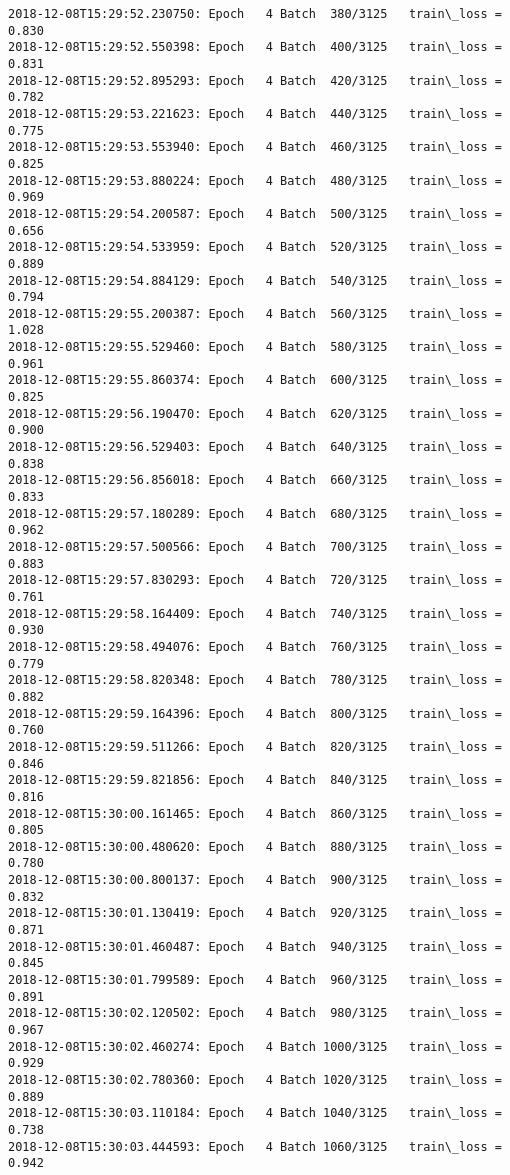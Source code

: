 \documentclass[11pt]{article}
\begin{document}
\begin{Verbatim}[commandchars=\\\{\}]
2018-12-08T15:29:52.230750: Epoch   4 Batch  380/3125   train\_loss = 0.830
2018-12-08T15:29:52.550398: Epoch   4 Batch  400/3125   train\_loss = 0.831
2018-12-08T15:29:52.895293: Epoch   4 Batch  420/3125   train\_loss = 0.782
2018-12-08T15:29:53.221623: Epoch   4 Batch  440/3125   train\_loss = 0.775
2018-12-08T15:29:53.553940: Epoch   4 Batch  460/3125   train\_loss = 0.825
2018-12-08T15:29:53.880224: Epoch   4 Batch  480/3125   train\_loss = 0.969
2018-12-08T15:29:54.200587: Epoch   4 Batch  500/3125   train\_loss = 0.656
2018-12-08T15:29:54.533959: Epoch   4 Batch  520/3125   train\_loss = 0.889
2018-12-08T15:29:54.884129: Epoch   4 Batch  540/3125   train\_loss = 0.794
2018-12-08T15:29:55.200387: Epoch   4 Batch  560/3125   train\_loss = 1.028
2018-12-08T15:29:55.529460: Epoch   4 Batch  580/3125   train\_loss = 0.961
2018-12-08T15:29:55.860374: Epoch   4 Batch  600/3125   train\_loss = 0.825
2018-12-08T15:29:56.190470: Epoch   4 Batch  620/3125   train\_loss = 0.900
2018-12-08T15:29:56.529403: Epoch   4 Batch  640/3125   train\_loss = 0.838
2018-12-08T15:29:56.856018: Epoch   4 Batch  660/3125   train\_loss = 0.833
2018-12-08T15:29:57.180289: Epoch   4 Batch  680/3125   train\_loss = 0.962
2018-12-08T15:29:57.500566: Epoch   4 Batch  700/3125   train\_loss = 0.883
2018-12-08T15:29:57.830293: Epoch   4 Batch  720/3125   train\_loss = 0.761
2018-12-08T15:29:58.164409: Epoch   4 Batch  740/3125   train\_loss = 0.930
2018-12-08T15:29:58.494076: Epoch   4 Batch  760/3125   train\_loss = 0.779
2018-12-08T15:29:58.820348: Epoch   4 Batch  780/3125   train\_loss = 0.882
2018-12-08T15:29:59.164396: Epoch   4 Batch  800/3125   train\_loss = 0.760
2018-12-08T15:29:59.511266: Epoch   4 Batch  820/3125   train\_loss = 0.846
2018-12-08T15:29:59.821856: Epoch   4 Batch  840/3125   train\_loss = 0.816
2018-12-08T15:30:00.161465: Epoch   4 Batch  860/3125   train\_loss = 0.805
2018-12-08T15:30:00.480620: Epoch   4 Batch  880/3125   train\_loss = 0.780
2018-12-08T15:30:00.800137: Epoch   4 Batch  900/3125   train\_loss = 0.832
2018-12-08T15:30:01.130419: Epoch   4 Batch  920/3125   train\_loss = 0.871
2018-12-08T15:30:01.460487: Epoch   4 Batch  940/3125   train\_loss = 0.845
2018-12-08T15:30:01.799589: Epoch   4 Batch  960/3125   train\_loss = 0.891
2018-12-08T15:30:02.120502: Epoch   4 Batch  980/3125   train\_loss = 0.967
2018-12-08T15:30:02.460274: Epoch   4 Batch 1000/3125   train\_loss = 0.929
2018-12-08T15:30:02.780360: Epoch   4 Batch 1020/3125   train\_loss = 0.889
2018-12-08T15:30:03.110184: Epoch   4 Batch 1040/3125   train\_loss = 0.738
2018-12-08T15:30:03.444593: Epoch   4 Batch 1060/3125   train\_loss = 0.942

\end{Verbatim}
\end{document}
